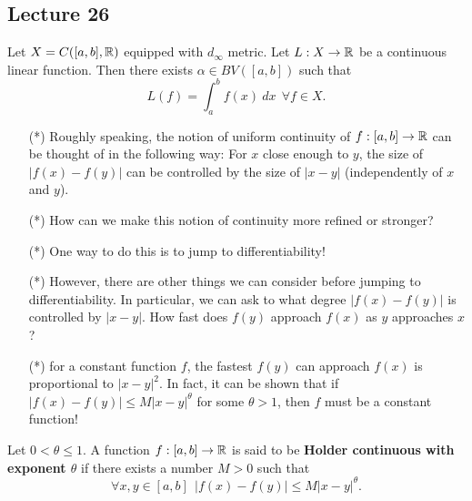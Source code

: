 \subsection{Lecture 26}

\begin{theorem}
    Let \( X = C([a,b], \mathbb{R} ) \) equipped with \( {d}_{\infty } \) metric. Let \( L : X \to \mathbb{R}  \) be a continuous linear function. Then there exists \( \alpha \in BV ([a,b]) \) such that 
    \[  L(f) = \int_{ a }^{ b } f(x) \ dx \ \ \forall f \in X. \]
\end{theorem}

\begin{remark}
    \begin{enumerate}
        \item[(*)] Roughly speaking, the notion of uniform continuity of \( f:[a,b] \to \mathbb{R}  \) can be thought of in the following way: For \( x  \) close enough to \( y \), the size of \( | f(x) - f(y) |  \) can be controlled by the size of \( | x - y  |  \) (independently of \( x  \) and \( y \)).
        \item[(*)] How can we make this notion of continuity more refined or stronger?
        \item[(*)] One way to do this is to jump to differentiability!
    \end{enumerate}
\end{remark}

\begin{remark}
   \begin{enumerate}
       \item[(*)] However, there are other things we can consider before jumping to differentiability. In particular, we can ask to what degree \( | f(x) - f(y) |  \) is controlled by \( | x - y  | \). How fast does \( f(y) \) approach \( f(x) \) as \( y  \) approaches \( x  \)?
        \item[(*)] for a constant function \( f  \), the fastest \( f(y) \) can approach \( f(x) \) is proportional to \( | x - y  |^{2} \). In fact, it can be shown that if \( | f(x) - f(y) |  \leq M |  x - y  |^{\theta} \) for some \( \theta > 1  \), then \( f  \) must be a constant function!
   \end{enumerate} 
\end{remark}

\begin{definition}
    Let \( 0 < \theta \leq 1  \). A function \( f: [a,b] \to \mathbb{R}  \) is said to be \textbf{Holder continuous with exponent \( \theta \)} if there exists a number \( M > 0  \) such that 
    \[  \forall x ,y \in [a,b] \ \ | f(x) - f(y) |  \leq M |  x-  y  |^{\theta}. \]
\end{definition}

